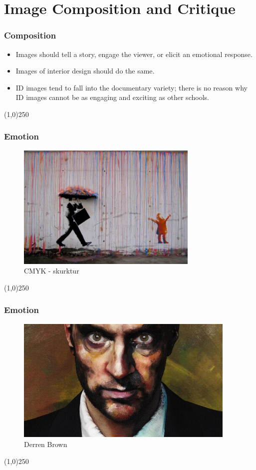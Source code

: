 \section{Image Composition and Critique}



\begin{frame}
\frametitle{Composition}
\begin{itemize}
	\item Images should tell a story, engage the viewer, or elicit an emotional response.
	\item Images of interior design should do the same.
	\item ID images tend to fall into the documentary variety; there is no reason why ID images cannot be as engaging and exciting as other schools.
\end{itemize}
\end{frame}
\begin{center}\line(1,0){250}\end{center}


\begin{frame}
\frametitle{Emotion}
\begin{figure}
	\centering
		\includegraphics[height=6cm]{img/candc/2091078908.jpg}
	\caption{CMYK - skurktur}
	\label{fig:CMYK}
\end{figure}
\end{frame}
\begin{center}\line(1,0){250}\end{center}


\begin{frame}
\frametitle{Emotion}
\begin{figure}
	\centering
		\includegraphics[height=6cm]{img/candc/DERREN-BROWN.jpg}
	\caption{Derren Brown}
	\label{fig:DerrenBrown}
\end{figure}
\end{frame}
\begin{center}\line(1,0){250}\end{center}



